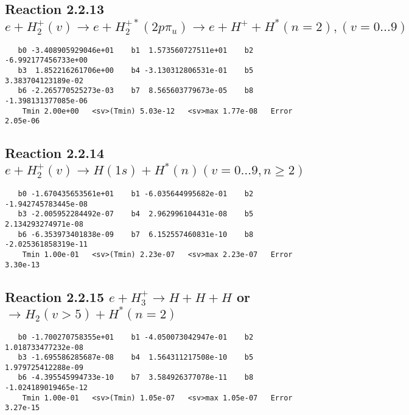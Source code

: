 \documentclass[12pt]{article}
\begin{document}
\newpage
\subsection{
Reaction 2.2.13 $ e + H_2^+(v) \rightarrow e + H_2^{+*} (2p\pi_u) \rightarrow e + H^+ + H^*(n=2),  (v=0\ldots 9)$}














\begin{small}\begin{verbatim}
   b0 -3.408905929046e+01    b1  1.573560727511e+01    b2 -6.992177456733e+00
   b3  1.852216261706e+00    b4 -3.130312806531e-01    b5  3.383704123189e-02
   b6 -2.265770525273e-03    b7  8.565603779673e-05    b8 -1.398131377085e-06
    Tmin 2.00e+00   <sv>(Tmin) 5.03e-12   <sv>max 1.77e-08   Error 2.05e-06
\end{verbatim}\end{small}

\newpage
\subsection{
Reaction 2.2.14 $  e + H_2^+(v) \rightarrow H(1s) + H^*(n)   (v=0\ldots 9, n \geq 2)$}


\begin{small}\begin{verbatim}
   b0 -1.670435653561e+01    b1 -6.035644995682e-01    b2 -1.942745783445e-08
   b3 -2.005952284492e-07    b4  2.962996104431e-08    b5  2.134293274971e-08
   b6 -6.353973401838e-09    b7  6.152557460831e-10    b8 -2.025361858319e-11
    Tmin 1.00e-01   <sv>(Tmin) 2.23e-07   <sv>max 2.23e-07   Error 3.30e-13
\end{verbatim}\end{small}

\newpage
\subsection{
Reaction 2.2.15 $  e + H_3^+ \rightarrow H + H + H$ or $\rightarrow H_2(v > 5) + H^*(n=2)$}


\begin{small}\begin{verbatim}
   b0 -1.700270758355e+01    b1 -4.050073042947e-01    b2  1.018733477232e-08
   b3 -1.695586285687e-08    b4  1.564311217508e-10    b5  1.979725412288e-09
   b6 -4.395545994733e-10    b7  3.584926377078e-11    b8 -1.024189019465e-12
    Tmin 1.00e-01   <sv>(Tmin) 1.05e-07   <sv>max 1.05e-07   Error 3.27e-15
\end{verbatim}\end{small}
\end{document}
